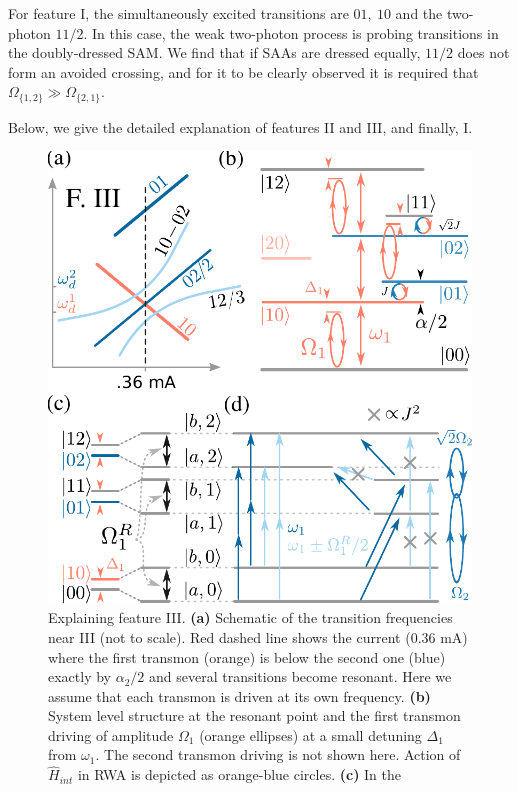 \documentclass[%
 pra,
 amsmath,amssymb,
 reprint,%
]{revtex4-1}
\begin{document}
For feature I, the simultaneously 
excited transitions are $01,\ 10$ and the 
two-photon $11/2$. In this case, the weak two-photon process is probing transitions in the doubly-dressed SAM. We find that if SAAs are dressed equally, $11/2$ does not form an avoided crossing, and for it to be clearly observed it is required that 
$\Omega_{\{1,2\}} \gg \Omega_{\{2,1\}}$. 

Below, we give the detailed explanation of features II and III, and finally, I.

\begin{figure}
	\centering
	\includegraphics[width=\linewidth]{main_scheme_2}  
	\caption{Explaining feature III. \textbf{(a)} 
	Schematic of the transition frequencies near 
	III (not to scale). Red dashed line shows the 
	current (0.36 mA) where the first transmon 
	(orange) is below the second one (blue) 
	exactly by $\alpha_2/2$ and several 
	transitions become resonant. Here we assume 
	that each transmon is driven at its own 
	frequency. \textbf{(b)} System level 
	structure at the resonant point and the first transmon 
	driving of amplitude $\Omega_1$ 
	(orange ellipses) at a small detuning 
	$\Delta_1$ from $\omega_1$. The second 
	transmon driving is not shown here. Action of 
	$\hat H_{int}$ in RWA is depicted as 
	orange-blue circles. \textbf{(c)} In the 
}
\end{figure}
\end{document}
